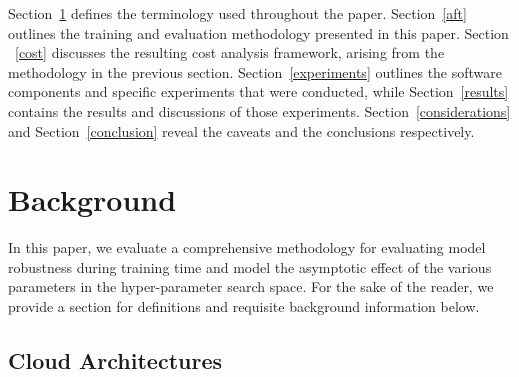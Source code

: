 \documentclass[conference]{IEEEtran}
\begin{document}
Section~\ref{background} defines the terminology used throughout the paper. Section~\ref{aft} outlines the training and evaluation methodology presented in this paper.  Section ~\ref{cost} discusses the resulting cost analysis framework, arising from the methodology in the previous section. Section~\ref{experiments} outlines the software components and specific experiments that were conducted, while Section~\ref{results} contains the results and discussions of those experiments. Section~\ref{considerations} and Section~\ref{conclusion} reveal the caveats and the conclusions respectively.


\section{Background}
\label{background}



In this paper, we evaluate a comprehensive methodology for evaluating model robustness during training time and model the asymptotic effect of the various parameters in the hyper-parameter search space. For the sake of the reader, we provide a section for definitions and requisite background information below.


\subsection{Cloud Architectures}
\end{document}
